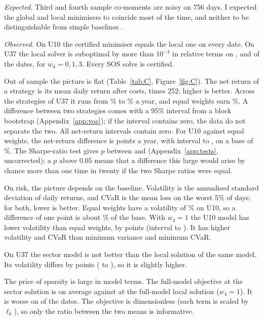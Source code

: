 \documentclass[11pt,a4paper]{article}
\begin{document}
\emph{Expected.}
Third and fourth sample co-moments are noisy on 756 days.
I expected the global and local minimisers to coincide most of the time, and neither to be distinguishable from simple baselines \cite{demiguel2009}.

\emph{Observed.}
On U10 the certified minimiser equals the local one on every date.
On U37 the local solver is suboptimal by more than $10^{-4}$ in relative terms on \cSubZero{}, \cSubOne{} and \cSubThree{} of the dates, for $w_4=0,1,3$.
Every SOS solve is certified.

Out of sample the picture is flat (Table~\ref{tab:C}, Figure~\ref{fig:C}).
The net return of a strategy is its mean daily return after costs, times 252; higher is better.
Across the \mNStrat{} strategies of U37 it runs from \mNetMin{}\% to \mNetMax{}\% a year, and equal weights earn \mNetEw{}\%.
A difference between two strategies comes with a 95\% interval from a block bootstrap (Appendix~\ref{app:voc}); if the interval contains zero, the data do not separate the two.
All \cTests{} net-return intervals contain zero.
For U10 against equal weights, the net-return difference is \cTenEwNet{} points a year, with interval \cTenEwNetLo{} to \cTenEwNetHi{}, on a base of \mTenNetEw{}\%.
The Sharpe-ratio test gives $p$ between \cPMin{} and \cPMax{} (Appendix~\ref{app:tests}, uncorrected); a $p$ above 0.05 means that a difference this large would arise by chance more than one time in twenty if the two Sharpe ratios were equal.

On risk, the picture depends on the baseline.
Volatility is the annualised standard deviation of daily returns, and CVaR is the mean loss on the worst 5\% of days; for both, lower is better.
Equal weights have a volatility of \mTenVolEw{}\% on U10, so a difference of one point is about \mTenVolOnePt{}\% of the base.
With $w_4=1$ the U10 model has lower volatility than equal weights, by \cTenEwVol{} points (interval \cTenEwVolLo{} to \cTenEwVolHi{}).
It has higher volatility and CVaR than minimum variance and minimum CVaR.

On U37 the sector model is not better than the local solution of the same model.
Its volatility differs by \cSecLocVol{} points (\cSecLocVolLo{} to \cSecLocVolHi{}), so it is slightly higher.

The price of sparsity is large in model terms.
The full-model objective at the sector solution is \cSpSecOne{} on average against \cSpFullOne{} at the full-model local solution ($w_4=1$).
It is worse on \cSpWorseOne{} of the dates.
The objective is dimensionless (each term is scaled by $\ell_k$), so only the ratio between the two means is informative.
\end{document}
